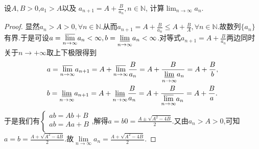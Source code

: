 \documentclass[../../main.tex]{subfiles}%
\begin{document}
\begin{example}
设\(A,B > 0\),\(a_1 > A\)以及
\(a_{n + 1} = A + \frac{B}{a_n}, n \in \mathbb{N}\),
计算\(\lim_{n \to \infty} a_n\).
\end{example}
\begin{proof}

显然$a_n>A>0,\forall n\in\mathbb{N}$.从而$a_{n+1}=A+\frac{B}{a_n}\leqslant  A+\frac{B}{A},\forall n\in\mathbb{N}$.故数列$\{a_n\}$有界.于是可设$a=\underset{n\rightarrow \infty}{{\varlimsup }}a_n<\infty,b=\underset{n\rightarrow \infty}{{\varliminf }}a_n<\infty$.对等式$a_{n + 1} = A + \frac{B}{a_n}$两边同时关于$n\to+\infty$取上下极限得到
\begin{align*}
&a=\underset{n\rightarrow \infty}{{\varlimsup }}a_{n+1}=A+\underset{n\rightarrow \infty}{{\varlimsup }}\frac{B}{a_n}=A+\frac{B}{\underset{n\rightarrow \infty}{{\varliminf }}a_n}=A+\frac{B}{b},
\\
&b=\underset{n\rightarrow \infty}{{\varliminf }}a_{n+1}=A+\underset{n\rightarrow \infty}{{\varliminf }}\frac{B}{a_n}=A+\frac{B}{\underset{n\rightarrow \infty}{{\varlimsup }}a_n}=A+\frac{B}{a}.
\end{align*}
于是我们有$\begin{cases}
ab=Ab+B\\
ab=Aa+B\\
\end{cases}$,解得$a=b0=\frac{A\pm\sqrt{A^2-4B}}{2}$.又由$a_n>A>0$,可知$a=b=\frac{A+\sqrt{A^2-4B}}{2}$.故$\underset{n\rightarrow \infty}{\lim}a_n=\frac{A+\sqrt{A^2-4B}}{2}$.

\end{proof}
\end{document}
